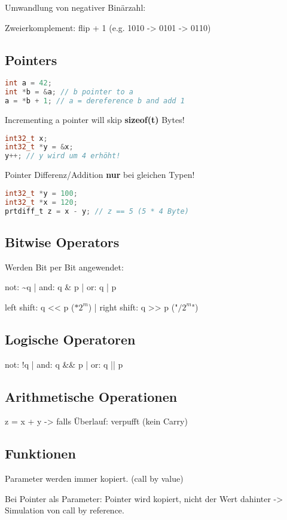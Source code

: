\begin{multicols*}{4}
Umwandlung von negativer Binärzahl:

Zweierkomplement: flip + 1 (e.g. 1010 -> 0101 -> 0110)

\subsection{Pointers}

\begin{lstlisting}[language=c]
int a = 42;
int *b = &a; // b pointer to a
a = *b + 1; // a = dereference b and add 1
\end{lstlisting}
Incrementing a pointer will skip \textbf{sizeof(t)} Bytes!
\begin{lstlisting}[language=c]
int32_t x;
int32_t *y = &x;
y++; // y wird um 4 erhöht!
\end{lstlisting}
\vspace{2pt}
Pointer Differenz/Addition \textbf{nur} bei gleichen Typen!
\begin{lstlisting}[language=c]
int32_t *y = 100;
int32_t *x = 120;
prtdiff_t z = x - y; // z == 5 (5 * 4 Byte)
\end{lstlisting}

\subsection{Bitwise Operators}
Werden Bit per Bit angewendet:

not: \~{}q | and: q \& p | or: q | p

left shift: q << p (\(* 2^m\)) | right shift: q >> p ("\(/ 2^m\)")

\subsection{Logische Operatoren}
not: !q | and: q \&\& p | or: q || p

\subsection{Arithmetische Operationen}
z = x + y -> falls Überlauf: verpufft (kein Carry)

\subsection{Funktionen}
Parameter werden immer kopiert. (call by value)\vspace{2pt}

Bei Pointer als Parameter: Pointer wird kopiert, nicht der Wert dahinter -> Simulation von call by reference.\vspace{2pt}


\end{multicols*}
